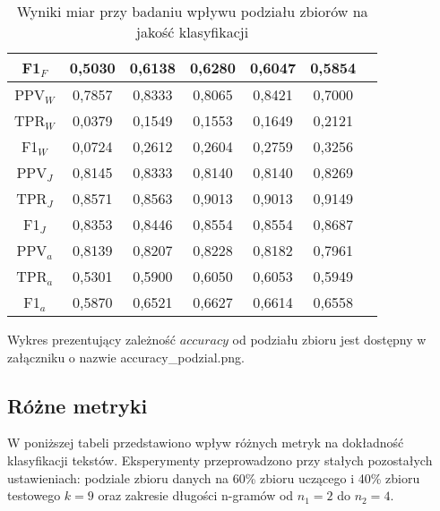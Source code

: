 \documentclass{article}
\begin{document}
\begin{table}[H]
\begin{tabular}{|c|c|c|c|c|c|c}
    F1\(_F\) & 0,5030 & 0,6138 & 0,6280 & 0,6047 & 0,5854\\ \hline
    PPV\(_W\) & 0,7857 & 0,8333 & 0,8065 & 0,8421 & 0,7000\\ \hline
    TPR\(_W\) & 0,0379 & 0,1549 & 0,1553 & 0,1649 & 0,2121\\ \hline
    F1\(_W\) & 0,0724 & 0,2612 & 0,2604 & 0,2759 & 0,3256\\ \hline
    PPV\(_J\) & 0,8145 & 0,8333 & 0,8140 & 0,8140 & 0,8269\\ \hline
    TPR\(_J\) & 0,8571 & 0,8563 & 0,9013 & 0,9013 & 0,9149\\ \hline
    F1\(_J\) & 0,8353 & 0,8446 & 0,8554 & 0,8554 & 0,8687\\ \hline
    PPV\(_a\) & 0,8139 & 0,8207 & 0,8228 & 0,8182 & 0,7961 \\ \hline
    TPR\(_a\) & 0,5301 & 0,5900 & 0,6050 & 0,6053 & 0,5949\\ \hline
    F1\(_a\) & 0,5870 & 0,6521 & 0,6627 & 0,6614 & 0,6558\\ \hline
    \end{tabular}
    \caption{Wyniki miar przy badaniu wpływu podziału zbiorów na jakość klasyfikacji}
\end{table}

Wykres prezentujący zależność \(accuracy\) od podziału zbioru jest dostępny w załączniku o nazwie accuracy\_podzial.png.


\subsection{Różne metryki}
W poniższej tabeli przedstawiono wpływ różnych metryk na dokładność klasyfikacji tekstów. Eksperymenty przeprowadzono przy stałych pozostałych ustawieniach: podziale zbioru danych na 60\% zbioru uczącego i 40\% zbioru testowego \(k = 9\) oraz zakresie długości n-gramów od \(n_1 = 2\) do \(n_2 = 4\). \\
\end{document}
